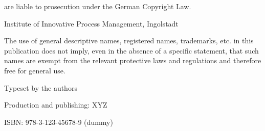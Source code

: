 \documentclass[11pt, showtrims, final, oldfontcommands]{memoir}
\begin{document}
are liable to prosecution under the German Copyright Law.\par
{} Institute of Innovative Process Management, Ingolstadt\par
The use of general descriptive names, registered names, trademarks, etc. in this publication does not imply, even in the absence of a specific statement, that such names are exempt from the relevant protective laws and regulations and therefore free for general use.\par
Typeset by the authors\par
Production and publishing: XYZ\par
ISBN: 978-3-123-45678-9 (dummy)
\endgroup
\clearpage

\pagestyle{companion}

\setupshorttoc
\tableofcontents
\cleardoublepage
\end{document}
